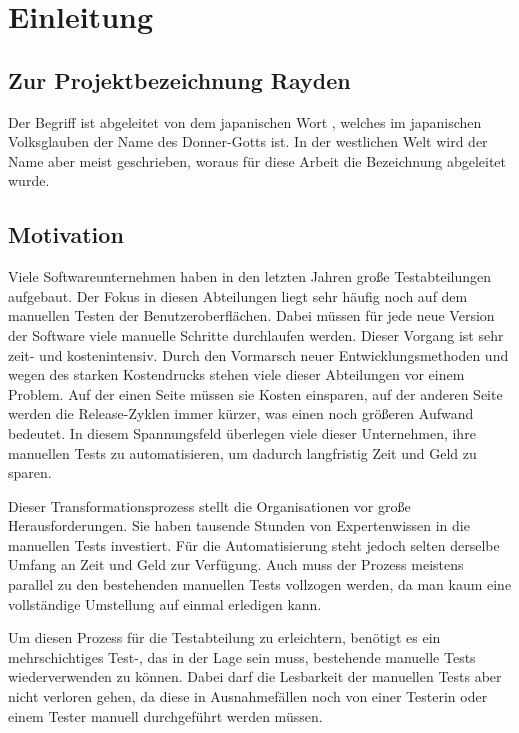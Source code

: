 \chapter{Einleitung}
\label{cha:Einleitung}

\section{Zur Projektbezeichnung Rayden}

Der Begriff  ist abgeleitet von dem japanischen Wort , welches im japanischen Volksglauben der Name des Donner-Gotts ist. In der westlichen Welt wird der Name aber meist  geschrieben, woraus für diese Arbeit die Bezeichnung  abgeleitet wurde.


\section{Motivation}

Viele Softwareunternehmen haben in den letzten Jahren große Testabteilungen aufgebaut. Der Fokus in diesen Abteilungen liegt sehr häufig noch auf dem manuellen Testen der Benutzeroberflächen. Dabei müssen für jede neue Version der Software viele manuelle Schritte durchlaufen werden. Dieser Vorgang ist sehr zeit- und kostenintensiv. Durch den Vormarsch neuer Entwicklungsmethoden und wegen des starken Kostendrucks stehen viele dieser Abteilungen vor einem Problem. Auf der einen Seite müssen sie Kosten einsparen, auf der anderen Seite werden die Release-Zyklen immer kürzer, was einen noch größeren Aufwand bedeutet. In diesem Spannungsfeld überlegen viele dieser Unternehmen, ihre manuellen Tests zu automatisieren, um dadurch langfristig Zeit und Geld zu sparen. 

\SuperPar
Dieser Transformationsprozess stellt die Organisationen vor große Herausforderungen. Sie haben tausende Stunden von Expertenwissen in die manuellen Tests investiert. Für die Automatisierung steht jedoch selten derselbe Umfang an Zeit und Geld zur Verfügung. Auch muss der Prozess meistens parallel zu den bestehenden manuellen Tests vollzogen werden, da man kaum eine vollständige Umstellung auf einmal erledigen kann.

\SuperPar
Um diesen Prozess für die Testabteilung zu erleichtern, benötigt es ein mehrschichtiges Test-, das in der Lage sein muss, bestehende manuelle Tests wiederverwenden zu können. Dabei darf die Lesbarkeit der manuellen Tests aber nicht verloren gehen, da diese in Ausnahmefällen noch von einer Testerin oder einem Tester manuell durchgeführt werden müssen.

